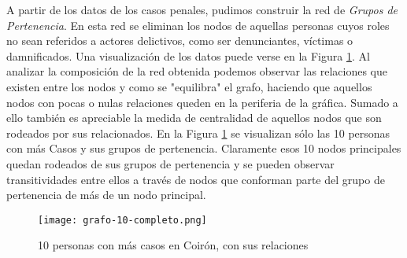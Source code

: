 A partir de los datos de los casos penales, pudimos construir la red de \textit{Grupos de Pertenencia}. En esta red se eliminan los nodos de aquellas personas cuyos roles no sean referidos a actores delictivos, como ser denunciantes, víctimas o damnificados. 
Una visualización de los datos puede verse en la Figura \ref{fig:grafoTop10}.
Al analizar la composición de la red obtenida podemos observar las relaciones que existen entre los nodos y como se "equilibra" el grafo, haciendo que aquellos nodos con pocas o nulas relaciones queden en la periferia de la gráfica. Sumado a ello también es apreciable la medida de centralidad de aquellos nodos que son rodeados por sus relacionados. 
En la Figura \ref{fig:grafoTop10} se visualizan sólo las 10 personas con más Casos y sus grupos de pertenencia. Claramente esos 10 nodos principales quedan rodeados de sus grupos de pertenencia y se pueden observar transitividades entre ellos a través de nodos que conforman parte del grupo de pertenencia de más de un nodo principal.
\begin{figure}
	\centering
	\texttt{[image: grafo-10-completo.png]}
	\caption{10 personas con más casos en Coirón, con sus relaciones} 
	\label{fig:grafoTop10}
\end{figure}
